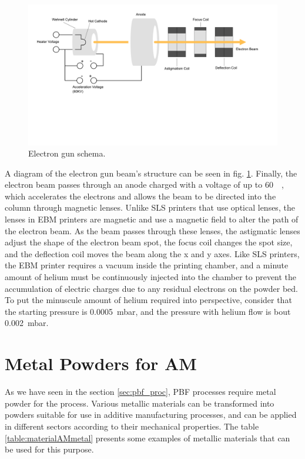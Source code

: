 \begin{figure}[H]
    \centering
    \includegraphics[scale=0.5]{Images/EBM.png}
    \caption[Electron gun schema.]{Electron gun schema.}
    \label{fig:electrongun}
\end{figure}

A diagram of the electron gun beam's structure can be seen in fig. \ref{fig:electrongun}. Finally, the electron beam passes through an anode charged with a voltage of up to \SI{60}{\kilo\Volt}, which accelerates the electrons and allows the beam to be directed into the column through magnetic lenses. Unlike SLS printers that use optical lenses, the lenses in EBM printers are magnetic and use a magnetic field to alter the path of the electron beam. As the beam passes through these lenses, the astigmatic lenses adjust the shape of the electron beam spot, the focus coil changes the spot size, and the deflection coil moves the beam along the x and y axes. Like SLS printers, the EBM printer requires a vacuum inside the printing chamber, and a minute amount of helium must be continuously injected into the chamber to prevent the accumulation of electric charges due to any residual electrons on the powder bed. To put the minuscule amount of helium required into perspective, consider that the starting pressure is \SI{0,0005}{\milli\bar}, and the pressure with helium flow is bout \SI{0,002}{\milli\bar}.


\section{Metal Powders for AM} \label{sec:metalpowders}
As we have seen in the section \ref{sec:pbf_proc}, PBF processes require metal powder for the process. Various metallic materials can be transformed into powders suitable for use in additive manufacturing processes, and can be applied in different sectors according to their mechanical properties. The table \ref{table:materialAMmetal} presents some examples of metallic materials that can be used for this purpose. 

